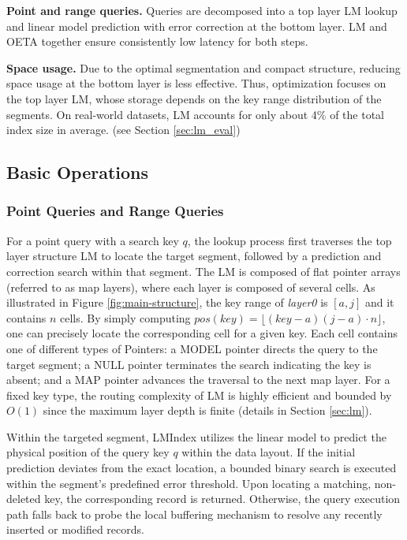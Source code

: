 \textbf{Point and range queries.} Queries are decomposed into a top layer LM lookup and linear model prediction with error correction at the bottom layer. LM and OETA together ensure consistently low latency for both steps.

\textbf{Space usage.} Due to the optimal segmentation and compact structure, reducing space usage at the bottom layer is less effective. Thus, optimization focuses on the top layer LM, whose storage depends on the key range distribution of the segments. On real-world datasets, LM accounts for only about 4\% of the total index size in average. (see Section \ref{sec:lm_eval})


\subsection{Basic Operations}
\subsubsection{Point Queries and Range Queries}
For a point query with a search key $q$, the lookup process first traverses the top layer structure LM to locate the target segment, followed by a prediction and correction search within that segment. The LM is composed of flat pointer arrays (referred to as map layers), where each layer is composed of several cells. As illustrated in Figure \ref{fig:main-structure}, the key range of \textit{layer0} is $[a, j]$ and it contains $n$ cells. By simply computing $pos(key) = \lfloor (key - a)(j - a) \cdot n \rfloor$, one can precisely locate the corresponding cell for a given key. Each cell contains one of different types of Pointers: a MODEL pointer directs the query to the target segment; a NULL pointer terminates the search indicating the key is absent; and a MAP pointer advances the traversal to the next map layer. For a fixed key type, the routing complexity of LM is highly efficient and bounded by $O(1)$ since the maximum layer depth is finite (details in Section \ref{sec:lm}).

Within the targeted segment, LMIndex utilizes the linear model to predict the physical position of the query key $q$ within the data layout. If the initial prediction deviates from the exact location, a bounded binary search is executed within the segment's predefined error threshold. Upon locating a matching, non-deleted key, the corresponding record is returned. Otherwise, the query execution path falls back to probe the local buffering mechanism to resolve any recently inserted or modified records.

